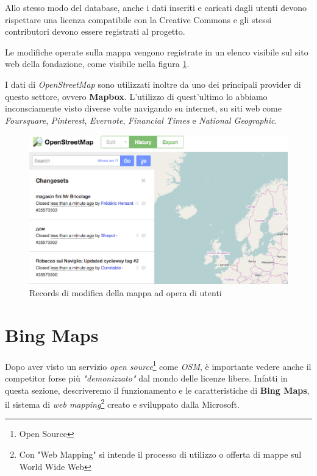 Allo stesso modo del database, anche i dati inseriti e caricati dagli utenti devono rispettare una licenza compatibile con la Creative Commons e gli stessi contributori devono essere registrati al progetto.

Le modifiche operate sulla mappa vengono registrate in un elenco visibile sul sito web della fondazione, come visibile nella figura \ref{fig:OSMchangesets}.

I dati di \textit{OpenStreetMap} sono utilizzati inoltre da uno dei principali provider di questo settore, ovvero \textbf{Mapbox}. L'utilizzo di quest'ultimo lo abbiamo inconsciamente visto diverse volte navigando su internet, su siti web come \textit{Foursquare}, \textit{Pinterest}, \textit{Evernote}, \textit{Financial Times} e \textit{National Geographic}.\cite{mapbox:showcase}

\begin{figure}[H]
	\centering
		\includegraphics[scale=0.5]{figure/OSMchangesets.eps}
	\caption{Records di modifica della mappa ad opera di utenti} \label{fig:OSMchangesets}
\end{figure}

\section{Bing Maps}

Dopo aver visto un servizio \textit{open source}\footnote{Open Source\cite{wiki:opensource}} come \textit{OSM}, è importante vedere anche il competitor forse più \textit{"demonizzato"} dal mondo delle licenze libere. Infatti in questa sezione, descriveremo il funzionamento e le caratteristiche di \textbf{Bing Maps}, il sistema di \textit{web mapping}\footnote{Con "Web Mapping" si intende il processo di utilizzo o offerta di mappe sul World Wide Web} creato e sviluppato dalla Microsoft.

